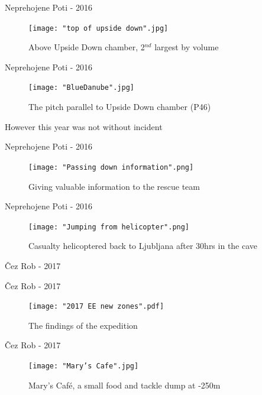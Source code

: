 \documentclass[10pt]{beamer}
\begin{document}
\begin{frame}{Neprehojene Poti - 2016}
    \begin{figure}[!ht]
    \centering
    \texttt{[image: "top of upside down".jpg]}
    \caption{Above Upside Down chamber, 2$^{nd}$ largest by volume}
    \end{figure}
\end{frame} 

\begin{frame}{Neprehojene Poti - 2016}
    \begin{figure}[!ht]
    \centering
    \texttt{[image: "BlueDanube".jpg]}
    \caption{The pitch parallel to Upside Down chamber (P46)}
    \end{figure}
\end{frame} 

\begin{frame}[standout]
However this year was not without incident 
\end{frame}

\begin{frame}{Neprehojene Poti - 2016}
    \begin{figure}[!ht]
    \centering
    \texttt{[image: "Passing down information".png]}
    \caption{Giving valuable information to the rescue team}
    \end{figure}
\end{frame} 

\begin{frame}{Neprehojene Poti - 2016}
    \begin{figure}[!ht]
    \centering
    \texttt{[image: "Jumping from helicopter".png]}
    \caption{Casualty helicoptered back to Ljubljana after 30hrs in the cave}
    \end{figure}
\end{frame} 


\begin{frame}[standout]
Čez Rob - 2017
\end{frame}

\begin{frame}{Čez Rob - 2017}
    \begin{figure}[!ht]
    \centering
    \texttt{[image: "2017 EE new zones".pdf]}
    \caption{The findings of the expedition}
    \end{figure}
\end{frame} 

\begin{frame}{Čez Rob - 2017}
    \begin{figure}[!ht]
    \centering
    \texttt{[image: "Mary's Cafe".jpg]}
    \caption{Mary's Café, a small food and tackle dump at -250m}
    \end{figure}
\end{frame} 
\end{document}
